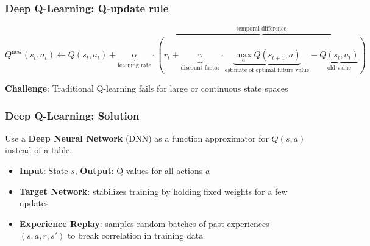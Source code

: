 \begin{frame}
	\frametitle{Deep Q-Learning: Q-update rule}
	\vspace{1cm}
		
			
		$$Q^{\text{new}}(s_t, a_t) \leftarrow Q(s_t, a_t) 
		+ \underbrace{\alpha}_{\text{learning rate}} \cdot 
		\overbrace{\left( r_t + \underbrace{\gamma}_{\text{discount factor}} 
		\cdot \underbrace{\max_a Q(s_{t+1}, a)}_{\text{estimate of optimal future value}} 
		- \underbrace{Q(s_t, a_t)}_{\text{old value}} \right)}^{\text{temporal difference}}$$
		
		\vspace{1cm}
		\pause
		\centering
		\textbf{Challenge}: Traditional Q-learning fails for large or continuous state spaces
\end{frame}

\begin{frame}
	\frametitle{Deep Q-Learning: Solution }
	\vspace{0.5cm}
	Use a \textbf{Deep Neural Network} (DNN) as a function approximator for $Q(s,a)$ instead of a table.
		\begin{itemize}		
			\item  \textbf{Input}: State $s$, \textbf{Output}: Q-values for all actions $a$
			\item \textbf{Target Network}: stabilizes training by holding fixed weights for a few updates
			\item \textbf{Experience Replay}: samples random batches of past experiences $(s,a,r,s')$ to break correlation in training data
		\end{itemize}
\end{frame}


